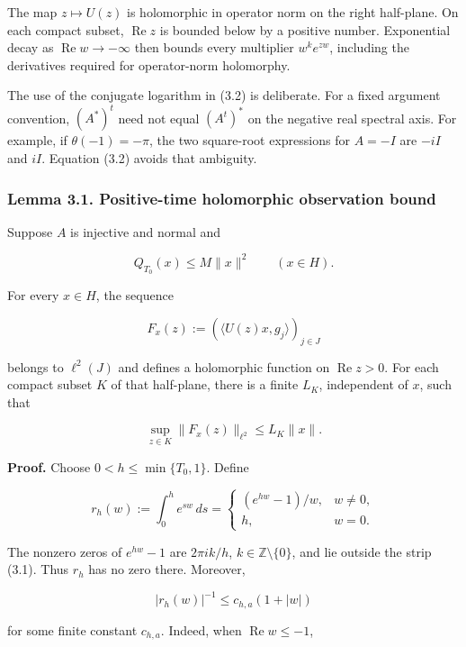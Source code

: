 \documentclass[
  11pt,
]{article}
\begin{document}
The map \(z\mapsto U(z)\) is holomorphic in operator norm on the right
half-plane. On each compact subset, \(\operatorname{Re}z\) is bounded
below by a positive number. Exponential decay as
\(\operatorname{Re}w\to-\infty\) then bounds every multiplier
\(w^k e^{zw}\), including the derivatives required for operator-norm
holomorphy.

The use of the conjugate logarithm in (3.2) is deliberate. For a fixed
argument convention, \((A^*)^t\) need not equal \((A^t)^*\) on the
negative real spectral axis. For example, if \(\theta(-1)=-\pi\), the
two square-root expressions for \(A=-I\) are \(-iI\) and \(iI\).
Equation (3.2) avoids that ambiguity.

\subsubsection{Lemma 3.1. Positive-time holomorphic observation
bound}\label{lemma-3.1.-positive-time-holomorphic-observation-bound}

Suppose \(A\) is injective and normal and

\[
Q_{T_0}(x)\leq M\|x\|^2\qquad(x\in H).          \tag{3.4}
\]

For every \(x\in H\), the sequence

\[
F_x(z):=(\langle U(z)x,g_j\rangle)_{j\in J}      \tag{3.5}
\]

belongs to \(\ell^2(J)\) and defines a holomorphic function on
\(\operatorname{Re}z>0\). For each compact subset \(K\) of that
half-plane, there is a finite \(L_K\), independent of \(x\), such that

\[
\sup_{z\in K}\|F_x(z)\|_{\ell^2}\leq L_K\|x\|. \tag{3.6}
\]

\textbf{Proof.} Choose \(0<h\leq\min\{T_0,1\}\). Define

\[
r_h(w):=\int_0^h e^{sw}\,ds
       =\begin{cases}(e^{hw}-1)/w,&w\neq0,\\h,&w=0.
         \end{cases}                            \tag{3.7}
\]

The nonzero zeros of \(e^{hw}-1\) are \(2\pi i k/h\),
\(k\in\mathbb Z\setminus\{0\}\), and lie outside the strip (3.1). Thus
\(r_h\) has no zero there. Moreover,

\[
|r_h(w)|^{-1}\leq c_{h,a}(1+|w|)                \tag{3.8}
\]

for some finite constant \(c_{h,a}\). Indeed, when
\(\operatorname{Re}w\leq-1\),
\end{document}
